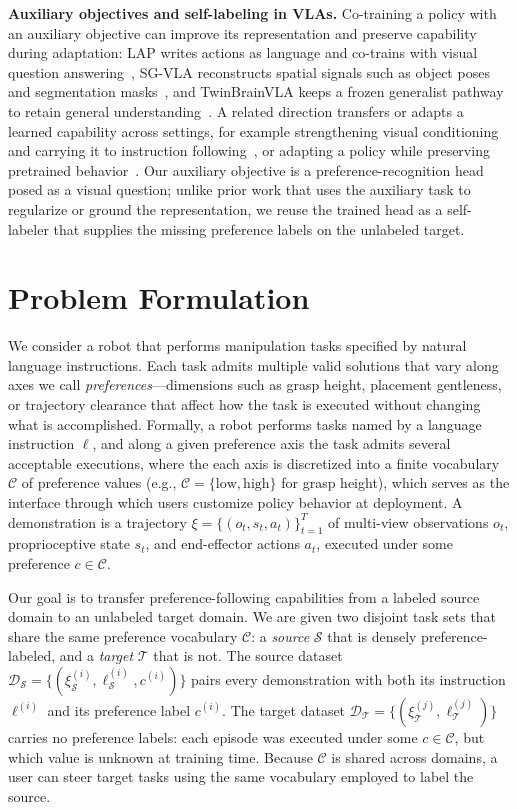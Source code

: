 \documentclass{article}
\begin{document}
\textbf{Auxiliary objectives and self-labeling in VLAs.}
Co-training a policy with an auxiliary objective can improve its representation and preserve capability during adaptation: LAP writes actions as language and co-trains with visual question answering~\citep{zha2026lap}, SG-VLA reconstructs spatial signals such as object poses and segmentation masks~\citep{tu2026sgvla}, and TwinBrainVLA keeps a frozen generalist pathway to retain general understanding~\citep{yu2026twinbrainvla}.
A related direction transfers or adapts a learned capability across settings, for example strengthening visual conditioning and carrying it to instruction following~\citep{chen2026vista}, or adapting a policy while preserving pretrained behavior~\citep{zhong2026vlaopd}.
Our auxiliary objective is a preference-recognition head posed as a visual question; unlike prior work that uses the auxiliary task to regularize or ground the representation, we reuse the trained head as a self-labeler that supplies the missing preference labels on the unlabeled target.


\section{Problem Formulation}
\label{sec:formulation}

We consider a robot that performs manipulation tasks specified by natural language instructions.
Each task admits multiple valid solutions that vary along axes we call \emph{preferences}---dimensions such as grasp height, placement gentleness, or trajectory clearance that affect how the task is executed without changing what is accomplished.
Formally, a robot performs tasks named by a language instruction $\ell$, and along a given preference axis the task admits several acceptable executions, where the each axis is discretized into a finite vocabulary $\mathcal{C}$ of preference values (e.g., $\mathcal{C}=\{\mathrm{low},\mathrm{high}\}$ for grasp height), which serves as the interface through which users customize policy behavior at deployment.
A demonstration is a trajectory $\xi=\{(o_t,s_t,a_t)\}_{t=1}^{T}$ of multi-view observations $o_t$, proprioceptive state $s_t$, and end-effector actions $a_t$, executed under some preference $c\in\mathcal{C}$.

Our goal is to transfer preference-following capabilities from a labeled source domain to an unlabeled target domain.
We are given two disjoint task sets that share the same preference vocabulary $\mathcal{C}$: a \emph{source} $\mathcal{S}$ that is densely preference-labeled, and a \emph{target} $\mathcal{T}$ that is not.
The source dataset $\mathcal{D}_{\mathcal{S}}=\{(\xi_{\mathcal{S}}^{(i)},\ell_{\mathcal{S}}^{(i)},c^{(i)})\}$ pairs every demonstration with both its instruction $\ell^{(i)}$ and its preference label $c^{(i)}$.
The target dataset $\mathcal{D}_{\mathcal{T}}=\{(\xi_{\mathcal{T}}^{(j)},\ell_{\mathcal{T}}^{(j)})\}$ carries no preference labels: each episode was executed under some $c\in\mathcal{C}$, but which value is unknown at training time.
Because $\mathcal{C}$ is shared across domains, a user can steer target tasks using the same vocabulary employed to label the source.
\end{document}
